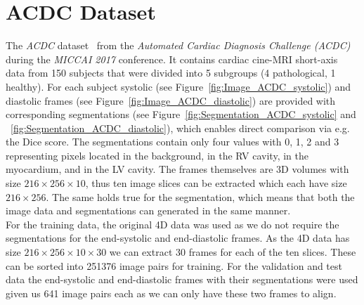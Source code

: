 \documentclass[english,version-2022-01]{uzl-thesis} %
\begin{document}
\section{ACDC Dataset} \label{Sec:ACDC}
The \emph{ACDC} dataset~\cite{ACDC} from the \emph{Automated Cardiac Diagnosis Challenge (ACDC)} during the \emph{MICCAI 2017} conference. It contains cardiac cine-MRI short-axis data from 150 subjects that were divided into 5 subgroups (4 pathological, 1 healthy). For each subject systolic (see Figure~\ref{fig:Image_ACDC_systolic}) and diastolic frames (see Figure~\ref{fig:Image_ACDC_diastolic}) are provided with corresponding segmentations (see Figure~\ref{fig:Segmentation_ACDC_systolic} and ~\ref{fig:Segmentation_ACDC_diastolic}), which enables direct comparison via e.g. the Dice score. The segmentations contain only four values with 0, 1, 2 and 3 representing pixels located in the background, in the RV cavity, in the myocardium, and in the LV cavity. The frames themselves are 3D volumes with size $216 \times 256 \times 10$, thus ten image slices can be extracted which each have size $216 \times 256$. The same holds true for the segmentation, which means that both the image data and segmentations can generated in the same manner.\\
For the training data, the original 4D data was used as we do not require the segmentations for the end-systolic and end-diastolic frames. As the 4D data has size $216 \times 256 \times 10 \times 30$ we can extract 30 frames for each of the ten slices. These can be sorted into 251376 image pairs for training. For the validation and test data the end-systolic and end-diastolic frames with their segmentations were used given us 641 image pairs each as we can only have these two frames to align.
\end{document}
